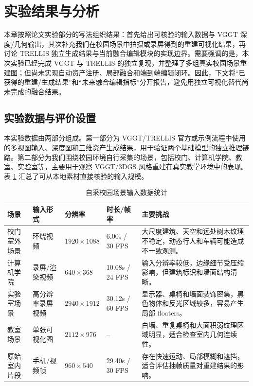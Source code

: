 \section{实验结果与分析}

本章按照论文实验部分的写法组织结果：首先给出可核验的输入数据与 VGGT 深度/几何输出，其次补充我们在校园场景中拍摄或录屏得到的重建可视化结果，再讨论 TRELLIS 独立生成结果与当前融合编辑模块的实现边界。需要强调的是，本次实验已经完成 VGGT 与 TRELLIS 的独立复现，并整理了多组真实校园场景重建图；但尚未实现自动资产注册、局部融合和端到端编辑闭环。因此，下文将“已获得的重建/生成结果”和“未来融合编辑指标”分开报告，避免用独立可视化替代尚未完成的融合结果。

\subsection{实验数据与评价设置}

本实验数据由两部分组成。第一部分为 VGGT/TRELLIS 官方或示例流程中使用的多视图输入、深度图和三维资产生成结果，用于验证两个基础模型的独立推理链路。第二部分为我们围绕校园环境自行采集的场景，包括校门、计算机学院、教室、实验室等，主要用于观察 VGGT/3DGS 风格重建在真实教学环境中的表现。表 \ref{tab:campus-data} 汇总了可从本地素材直接核验的输入规模。

\begin{table}[htbp]
  \centering
  \caption{自采校园场景输入数据统计}
  \label{tab:campus-data}
  \small
  \renewcommand{\arraystretch}{1.22}
  \begin{tabularx}{\linewidth}{>{\raggedright\arraybackslash}p{2.3cm} p{2.4cm} p{2.1cm} p{1.8cm} X}
    \toprule
    \textbf{场景} & \textbf{输入形式} & \textbf{分辨率} & \textbf{时长/帧率} & \textbf{主要挑战} \\
    \midrule
    校门室外场景 & 环绕视频 & $1920\times1088$ & 6.00s / 30 FPS & 大尺度建筑、天空和远处树木纹理不稳定，动态行人和车辆可能造成不一致观测。 \\
    计算机学院 & 录屏/渲染视频 & $640\times368$ & 10.08s / 24 FPS & 输入分辨率较低，边缘细节受压缩影响，但建筑标识和墙面结构清晰。 \\
    实验室场景 & 高分辨率录屏视频 & $2940\times1912$ & 30.12s / 60 FPS & 显示器、桌椅和墙面装饰密集，黑色物体和反光区域较多，容易产生局部 floaters。 \\
    教室场景 & 单张可视化图 & $2112\times976$ & -- & 白墙、重复桌椅和大面积弱纹理区域明显，适合检查室内几何连续性。 \\
    原始室内片段 & 手机/视频帧 & $960\times540$ & 29.40s / 30 FPS & 存在快速运动、局部模糊和遮挡，适合评估抽帧质量对重建结果的影响。 \\
    \bottomrule
  \end{tabularx}
\end{table}

